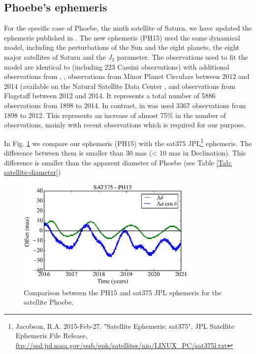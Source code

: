 \documentclass[useAMS,usenatbib]{mn2e}
\begin{document}
\subsection{Phoebe's ephemeris}

For the specific case of Phoebe, the ninth satellite of Saturn, we have updated the ephemeris published in \cite{Desmars2013}. The new ephemeris (PH15) used the same dynamical model, including the perturbations of the Sun and the eight planets, the eight major satellites of Saturn and the $J_2$ parameter. The observations used to fit the model are identical to \cite{Desmars2013} (including 223 Cassini observations) with additional observations from , \cite{Peng2015}, observations from Minor Planet Circulars between 2012 and 2014 (available on the Natural Satellite Data Center \citep{Arlot2009}, and observations from Flagstaff \citep{NOFS} between 2012 and 2014. It represents a total number of 5886 observations from 1898 to 2014. In contrast, in \cite{Desmars2013} was used 3367 observations from 1898 to 2012. This represents an increase of almost 75\% in the number of observations, mainly with recent observations which is required for our purpose.

In Fig. \ref{Fig:eph-Phoebe} we compare our ephemeris (PH15) with the sat375 JPL\footnote{Jacobson, R.A. 2015-Feb-27. "Satellite Ephemeris: sat375", JPL Satellite Ephemeris File Release, \url{ftp://ssd.jpl.nasa.gov/pub/eph/satellites/nio/LINUX_PC/sat375l.txt}} ephemeris. The difference between them is smaller than 30 mas (< 10 mas in Declination). This difference is smaller than the apparent diameter of Phoebe (see Table \ref{Tab: satellite-diameter})

\begin{figure}
\begin{centering}
\includegraphics[width=8.8cm]{figures/Phoebe.eps} 
\caption{Comparison between the PH15 and sat375 JPL ephemeris for the satellite Phoebe.}
\label{Fig:eph-Phoebe}
\end{centering}
\end{figure}
\end{document}
